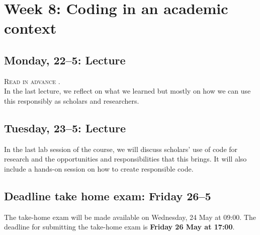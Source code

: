 \section*{Week 8: Coding in an academic context}

\subsection*{Monday, 22--5: Lecture}
\textsc{ Read in advance \cite{baden_three_2022}.} \\

In the last lecture, we reflect on what we learned but mostly on how we can use this responsibly as scholars and researchers. 

\subsection*{Tuesday, 23--5: Lecture}
In the last lab session of the course, we will discuss scholars' use of code for research and the opportunities and responsibilities that this brings. It will also include a hands-on session on how to create responsible code.

\subsection*{Deadline take home exam: Friday 26--5}
The take-home exam will be made available on Wednesday, 24 May at 09:00. The deadline for submitting the take-home exam is \textbf{Friday 26 May at 17:00}.








